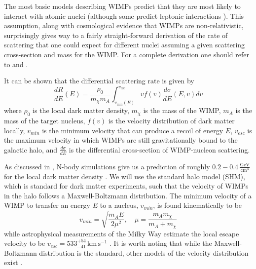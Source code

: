 The most basic models describing WIMPs predict that they are most likely to interact with atomic nuclei (although some predict leptonic interactions \cite{kopp2009dama}).  This assumption, along with cosmological evidence that WIMPs are non-relativistic, surprisingly gives way to a fairly straight-forward derivation of the rate of scattering that one could expect for different nuclei assuming a given scattering cross-section and mass for the WIMP.  For a complete derivation one should refer to  and .

It can be shown that the differential scattering rate is given by \cite{undagoitia2015dark}
%
\begin{equation}
        \frac{dR}{dE}(E) = \frac{\rho_0}{m_{\chi} m_{A}} \int_{v_{\textrm{min}}(E)}^{v_{\textrm{esc}}} v f(v) \frac{d\sigma}{dE}(E, v) dv
\end{equation} 
%
where $\rho_0$ is the local dark matter density, $m_{\chi}$ is the mass of the WIMP, $m_{A}$ is the mass of the target nucleus, $f(v)$ is the velocity distribution of dark matter locally, $v_{min}$ is the minimum velocity that can produce a recoil of energy $E$, $v_{esc}$ is the maximum velocity in which WIMPs are still gravitationally bound to the galactic halo, and $\frac{d\sigma}{dE}$ is the differential cross-section of WIMP-nucleon scattering.  

As discussed in , N-body simulations give us a prediction of roughly $0.2 - 0.4 \, \frac{\textrm{GeV}}{\textrm{cm}^3}$ for the local dark matter density \cite{read2014local}.  We will use the standard halo model (SHM), which is standard for dark matter experiments,  such that the velocity of WIMPs in the halo follows a Maxwell-Boltzmann distribution.  The minimum velocity of a WIMP to transfer an energy $E$ to a nucleus, $v_{min}$, is found kinematically to be 
%
\begin{equation}
        v_{min} = \sqrt{\frac{m_A E}{2 \mu^2}},  \quad
        \mu = \frac{m_A m_{\chi}}{m_A + m_{\chi}}
\end{equation}
%
while astrophysical measurements of the Milky Way estimate the local escape velocity to be $v_{esc} = 533^{+54}_{-41} \, \textrm{km} \, \textrm{s}^{-1}$ \cite{piffl2014rave}.  It is worth noting that while the Maxwell-Boltzmann distribution is the standard, other models of the velocity distribution exist \cite{kuhlen2010dark}.

